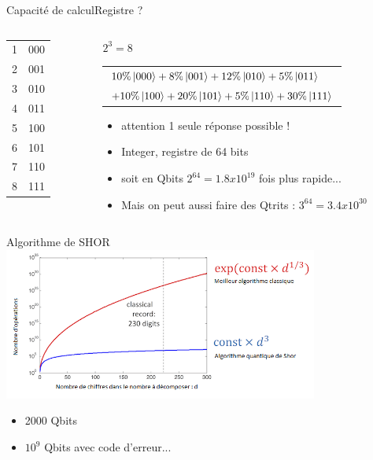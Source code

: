 \documentclass{beamer}
\begin{document}
\begin{frame}{Capacit\'e de calcul}{Registre ?}
  \begin{columns}
    \begin{column}{0.25\textwidth}
      \begin{table}
        \begin{tabular}{ll}
          1 & 000\\
          2 & 001\\
          3 & 010\\
          4 & 011\\
          5 & 100\\
          6 & 101\\
          7 & 110\\
          8 & 111\\
        \end{tabular}
      \end{table}
    \end{column}
    \begin{column}{0.75\textwidth}
      \begin{table}
        $2^3 = 8$
        \begin{tabular}{l}
          $10\%\ket{000}+8\%\ket{001}+12\%\ket{010}+5\%\ket{011}$\\
          $+10\%\ket{100}+20\%\ket{101}+5\%\ket{110}+30\%\ket{111}$\\
        \end{tabular}
      \end{table}
      \begin{itemize}
      \item attention 1 seule r\'eponse possible !
      \item Integer, registre de 64 bits 
      \item soit en Qbits $2^{64} = 1.8x10^{19}$ fois plus rapide...
      \item Mais on peut aussi faire des Qtrits : $3^{64} = 3.4x10^{30}$
      \end{itemize}
    \end{column}
  \end{columns}
\end{frame}

\begin{frame}{Algorithme de SHOR}{}
  \includegraphics[height=5cm]{shor.png}
  \begin{itemize}
  \item 2000 Qbits 
  \item $10^9$ Qbits avec code d'erreur...
  \end{itemize}
\end{frame}
\end{document}
